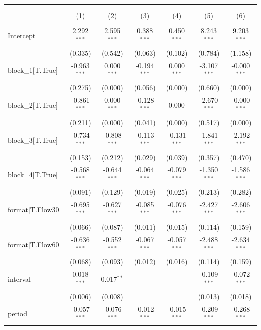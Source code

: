 \begin{table}[!htbp] \centering
\begin{tabular}{@{\extracolsep{5pt}}lcccccc}
\\[-1.8ex]\hline
\hline \\[-1.8ex]
\\[-1.8ex] & (1) & (2) & (3) & (4) & (5) & (6) \\
\hline \\[-1.8ex]
 Intercept & 2.292$^{***}$ & 2.595$^{***}$ & 0.388$^{***}$ & 0.450$^{***}$ & 8.243$^{***}$ & 9.203$^{***}$ \\
& (0.335) & (0.542) & (0.063) & (0.102) & (0.784) & (1.158) \\
 block_1[T.True] & -0.963$^{***}$ & 0.000$^{***}$ & -0.194$^{***}$ & 0.000$^{***}$ & -3.107$^{***}$ & -0.000$^{***}$ \\
& (0.275) & (0.000) & (0.056) & (0.000) & (0.660) & (0.000) \\
 block_2[T.True] & -0.861$^{***}$ & 0.000$^{***}$ & -0.128$^{***}$ & 0.000$^{}$ & -2.670$^{***}$ & -0.000$^{***}$ \\
& (0.211) & (0.000) & (0.041) & (0.000) & (0.517) & (0.000) \\
 block_3[T.True] & -0.734$^{***}$ & -0.808$^{***}$ & -0.113$^{***}$ & -0.131$^{***}$ & -1.841$^{***}$ & -2.192$^{***}$ \\
& (0.153) & (0.212) & (0.029) & (0.039) & (0.357) & (0.470) \\
 block_4[T.True] & -0.568$^{***}$ & -0.644$^{***}$ & -0.064$^{***}$ & -0.079$^{***}$ & -1.350$^{***}$ & -1.586$^{***}$ \\
& (0.091) & (0.129) & (0.019) & (0.025) & (0.213) & (0.282) \\
 format[T.Flow30] & -0.695$^{***}$ & -0.627$^{***}$ & -0.085$^{***}$ & -0.076$^{***}$ & -2.427$^{***}$ & -2.606$^{***}$ \\
& (0.066) & (0.087) & (0.011) & (0.015) & (0.114) & (0.159) \\
 format[T.Flow60] & -0.636$^{***}$ & -0.552$^{***}$ & -0.067$^{***}$ & -0.057$^{***}$ & -2.488$^{***}$ & -2.634$^{***}$ \\
& (0.068) & (0.093) & (0.012) & (0.016) & (0.114) & (0.159) \\
 interval & 0.018$^{***}$ & 0.017$^{**}$ & & & -0.109$^{***}$ & -0.072$^{***}$ \\
& (0.006) & (0.008) & & & (0.013) & (0.018) \\
 period & -0.057$^{***}$ & -0.076$^{***}$ & -0.012$^{***}$ & -0.015$^{***}$ & -0.209$^{***}$ & -0.268$^{***}$ \\

\end{tabular}
\end{table}
